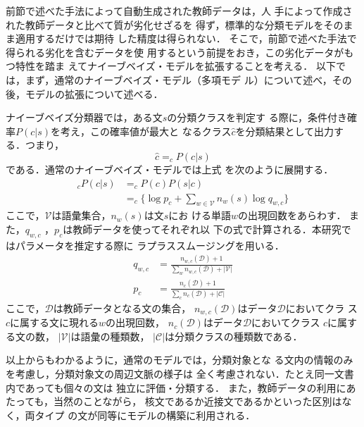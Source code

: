 \documentclass[japanese]{jnlp_1.4}
\newcommand{\argmax}{}
\begin{document}
前節で述べた手法によって自動生成された教師データは，人
手によって作成された教師データと比べて質が劣化せざるを
得ず，標準的な分類モデルをそのまま適用するだけでは期待
した精度は得られない．
そこで，前節で述べた手法で得られる劣化を含むデータを使
用するという前提をおき，この劣化データがもつ特性を踏ま
えてナイーブベイズ・モデルを拡張することを考える．
以下では，まず，通常のナイーブベイズ・モデル（多項モデ
  ル）について述べ，その後，モデルの拡張について述べる．

ナイーブベイズ分類器では，ある文$s$の分類クラスを判定す
る際に，条件付き確率$P(c|s)$を考え，この確率値が最大と
なるクラス$\hat{c}$を分類結果として出力する．つまり，
\begin{equation}
\hat{c} = \argmax _{c}P(c|s)
\label{eq:eq0}
\end{equation}
である．通常のナイーブベイズ・モデルでは上式
を次のように展開する．
\begin{align}
 \argmax _{c}P(c|s)
	&= \argmax _{c}P(c)P(s|c)\nonumber \\ 
	& = \argmax_{c} \big\{ \log p_{c}+\sum_{w\in{\mathcal{V}}}^{}n_{w}(s)\log q_{w,c} \big\}
\label{eq:eq1}
\end{align}
ここで，$\mathcal{V}$は語彙集合，$n_{w}(s)$は文$s$にお
ける単語$w$の出現回数をあらわす．
また，$q_{w,c}$ ，$p_{c}$は教師データを使ってそれぞれ以
下の式で計算される．本研究ではパラメータを推定する際に
ラプラススムージング\cite{nv}を用いる．
\begin{align}
q_{w,c}&= \frac{\displaystyle n_{w,c}(\mathcal{D})+1}{\displaystyle \sum_{w}^{}n_{w,c}(\mathcal{D})+|\mathcal{V}|}\label{eq:eq2}\\
p_{c}  &= \frac{\displaystyle n_{c}(\mathcal{D})+1}{\displaystyle \sum_{c}^{}n_{c}(\mathcal{D})+|\mathcal{C}|} \label{eq:eq3}
\end{align}
ここで，$\mathcal{D}$は教師データとなる文の集合，
$n_{w,c}(\mathcal{D})$はデータ$\mathcal{D}$においてクラ
ス$c$に属する文に現れる$w$の出現回数，
$n_{c}(\mathcal{D})$はデータ$\mathcal{D}$においてクラス
$c$に属する文の数，
$|\mathcal{V}|$は語彙の種類数，
$|\mathcal{C}|$は分類クラスの種類数である．


以上からもわかるように，通常のモデルでは，分類対象とな
る文内の情報のみを考慮し，分類対象文の周辺文脈の様子は
全く考慮されない．たとえ同一文書内であっても個々の文は
独立に評価・分類する．
また，教師データの利用にあたっても，当然のことながら，
核文であるか近接文であるかといった区別はなく，両タイプ
の文が同等にモデルの構築に利用される．
\end{document}
